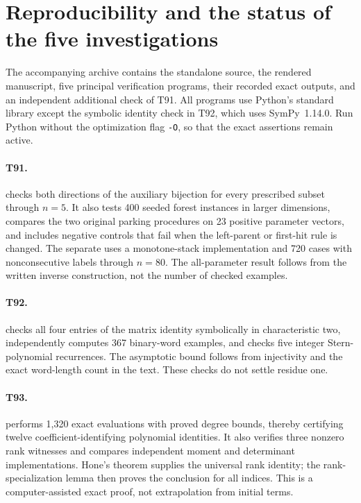 \documentclass[11pt,a4paper]{article}
\theoremstyle{definition}
\theoremstyle{remark}
\begin{document}
\appendix
\section{Reproducibility and the status of the five investigations}

The accompanying archive contains the standalone source, the rendered
manuscript, five principal verification programs, their recorded exact
outputs, and an independent additional check of T91. All programs use
Python's standard library except the symbolic identity check in T92,
which uses SymPy~1.14.0. Run Python without the optimization flag
\texttt{-O}, so that the exact assertions remain active.

\paragraph{T91.}
 checks both directions of the auxiliary
bijection for every prescribed subset through $n=5$. It also tests 400
seeded forest instances in larger dimensions, compares the two original
parking procedures on 23 positive parameter vectors, and includes
negative controls that fail when the left-parent or first-hit rule is
changed. The separate  uses a
monotone-stack implementation and 720 cases with nonconsecutive labels
through $n=80$. The all-parameter result follows from the written inverse
construction, not the number of checked examples.

\paragraph{T92.}
 checks all four entries of the matrix
identity symbolically in characteristic two, independently computes 367
binary-word examples, and checks five integer Stern-polynomial
recurrences. The asymptotic bound follows from injectivity and the exact
word-length count in the text. These checks do not settle residue one.

\paragraph{T93.}
 performs 1,320 exact evaluations with proved
degree bounds, thereby certifying twelve coefficient-identifying
polynomial identities. It also verifies three nonzero rank witnesses and
compares independent moment and determinant implementations. Hone's
theorem supplies the universal rank identity; the rank-specialization
lemma then proves the conclusion for all indices. This is a
computer-assisted exact proof, not extrapolation from initial terms.
\end{document}
